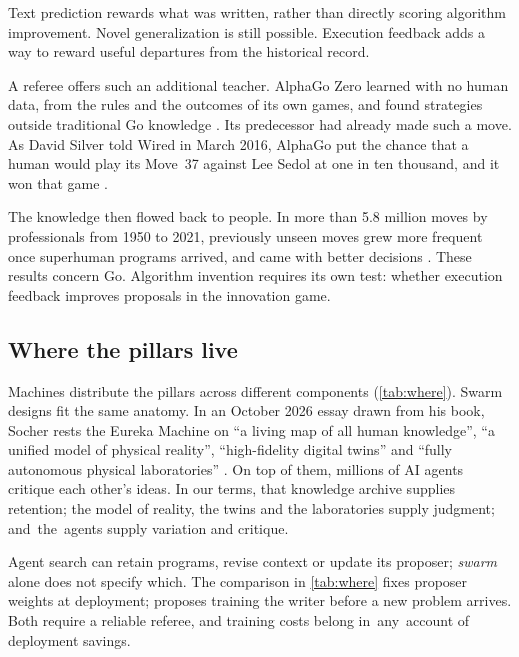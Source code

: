 Text prediction rewards what was written, rather than directly scoring
algorithm improvement. Novel generalization is still possible. Execution
feedback adds a way to reward useful departures from the historical record.

A referee offers such an additional teacher. AlphaGo Zero learned with no human data, from the rules and the outcomes of its own games, and found strategies outside traditional Go knowledge \citep{silver2017mastering}. Its predecessor had already made such a move. As David Silver told Wired in March 2016, AlphaGo put the chance that a human would play its Move~37 against Lee Sedol at one in ten thousand, and it won that game \citep{metz2016twomoves}.

The knowledge then flowed back to people. In more than 5.8 million moves by professionals from 1950 to 2021, previously unseen moves grew more frequent once superhuman programs arrived, and came with better decisions \citep{shin2023superhuman}. These results concern Go. Algorithm invention requires its own test:
whether execution feedback improves proposals in the innovation game.

\subsection{Where the pillars live}\label{sub:anatomy-where}

Machines distribute the pillars across different components
(\cref{tab:where}). Swarm designs fit the same anatomy. In an October 2026 essay drawn from his book, Socher rests the Eureka Machine on ``a living map of all human knowledge'', ``a unified model of physical reality'', ``high-fidelity digital twins'' and ``fully autonomous physical laboratories'' \citep{socher2026bookbite,socher2026eureka}. On top of them, millions of AI agents critique each other's ideas. In our terms, that knowledge archive supplies retention; the model of reality, the twins and the laboratories supply judgment; \mbox{and the agents} supply variation and critique.

Agent search can retain programs, revise context or update its proposer;
\emph{swarm} alone does not specify which. The comparison in
\cref{tab:where} fixes proposer weights at deployment; \EZ{} proposes
training the writer before a new problem arrives. Both require a reliable
referee, and training costs belong \mbox{in any account} of deployment savings.


